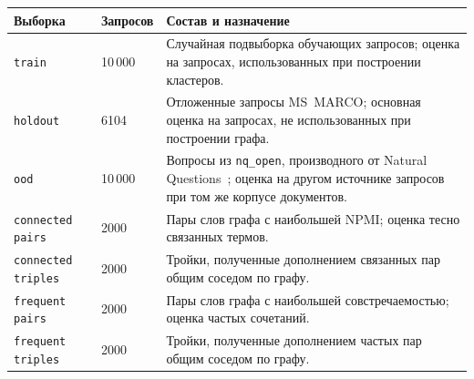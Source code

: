 \documentclass[10pt, a4paper, twoside]{article}
\newcommand{\strategy}[1]{\texttt{#1}}
\begin{document}
\noindent\begin{minipage}{\textwidth}
\captionsetup{type=table}
\label{tab:samples}
\centering\small
\setlength{\tabcolsep}{4pt}
\begin{tabular}{|L{0.23\textwidth}|l|L{0.61\textwidth}|}
\hline
Выборка & Запросов & Состав и назначение\\
\hline
\strategy{train} & 10\,000 & Случайная подвыборка обучающих запросов; оценка на запросах, использованных при построении кластеров.\\
\hline
\strategy{holdout} & 6104 & Отложенные запросы MS~MARCO; основная оценка на запросах, не использованных при построении графа.\\
\hline
\strategy{ood} & 10\,000 & Вопросы из \texttt{nq\_open}, производного от Natural Questions~\cite{kwiatkowski2019}; оценка на другом источнике запросов при том же корпусе документов.\\
\hline
\strategy{connected pairs} & 2000 & Пары слов графа с наибольшей NPMI; оценка тесно связанных термов.\\
\hline
\strategy{connected triples} & 2000 & Тройки, полученные дополнением связанных пар общим соседом по графу.\\
\hline
\strategy{frequent pairs} & 2000 & Пары слов графа с наибольшей совстречаемостью; оценка частых сочетаний.\\
\hline
\strategy{frequent triples} & 2000 & Тройки, полученные дополнением частых пар общим соседом по графу.\\
\hline
\end{tabular}
\end{minipage}
\end{document}

